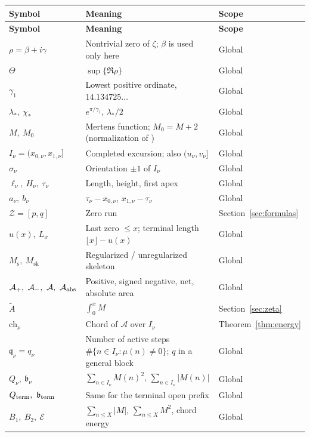 \documentclass[11pt]{amsart}
\numberwithin{equation}{section}
\theoremstyle{plain}
\theoremstyle{definition}
\theoremstyle{remark}
\newcommand{\Ms}{M_{\mathrm{s}}}
\newcommand{\Msk}{M_{\mathrm{sk}}}
\newcommand{\Ap}{\mathcal{A}_{+}}
\newcommand{\Am}{\mathcal{A}_{-}}
\newcommand{\Anet}{\mathcal{A}}
\newcommand{\En}{\mathcal{E}}
\begin{document}
\small
\setlength{\LTpre}{4pt}
\setlength{\LTpost}{8pt}
\begin{longtable}{@{}p{}p{}p{}@{}}
\toprule
\textbf{Symbol} & \textbf{Meaning} & \textbf{Scope}\\
\midrule
\endfirsthead
\toprule
\textbf{Symbol} & \textbf{Meaning} & \textbf{Scope}\\
\midrule
\endhead
$\rho=\beta+i\gamma$ & Nontrivial zero of $\zeta$; $\beta$ is used only here & Global\\
$\Theta$ & $\sup\{\Re\rho\}$ & Global\\
$\gamma_1$ & Lowest positive ordinate, $14.134725\ldots$ & Global\\
$\lambda_*,\ \chi_*$ & $e^{\pi/\gamma_1}$, $\lambda_*/2$ & Global\\
$M,\ M_0$ & Mertens function; $M_0=M+2$ (normalization of \cite{KP86}) & Global\\
$I_\nu=(x_{0,\nu},x_{1,\nu}]$ & Completed excursion; also $(u_\nu,v_\nu]$ & Global\\
$\sigma_\nu$ & Orientation $\pm1$ of $I_\nu$ & Global\\
$\ell_\nu,\ H_\nu,\ \tau_\nu$ & Length, height, first apex & Global\\
$a_\nu,\ b_\nu$ & $\tau_\nu-x_{0,\nu}$, $x_{1,\nu}-\tau_\nu$ & Global\\
$\mathcal Z=[p,q]$ & Zero run & Section~\ref{sec:formulas}\\
$u(x),\ L_x$ & Last zero $\le x$; terminal length $\lfloor x\rfloor-u(x)$ & Global\\
$\Ms,\ \Msk$ & Regularized / unregularized skeleton & Global\\
$\Ap,\ \Am,\ \Anet,\ \mathcal A_{\rm abs}$ & Positive, signed negative, net, absolute area & Global\\
$\widetilde A$ & $\int_0^xM$ & Section~\ref{sec:zeta}\\
$\mathrm{ch}_\nu$ & Chord of $\Anet$ over $I_\nu$ & Theorem~\ref{thm:energy}\\
$\mathfrak q_\nu=q_\nu$ & Number of active steps $\#\{n\in I_\nu:\mu(n)\ne0\}$; $q$ in a general block & Global\\
$Q_\nu,\ \mathfrak b_\nu$ & $\sum_{n\in I_\nu}M(n)^2$, $\sum_{n\in I_\nu}|M(n)|$ & Global\\
$Q_{\rm term},\ \mathfrak b_{\rm term}$ & Same for the terminal open prefix & Global\\
$B_1,\ B_2,\ \En$ & $\sum_{n\le X}|M|$, $\sum_{n\le X}M^2$, chord energy & Global\\

\end{longtable}
\end{document}
